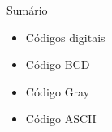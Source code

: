 
\begin{frame}{Sumário}
    \begin{itemize}
        \item Códigos digitais
        \item Código BCD
        \item Código Gray
        \item Código ASCII
    \end{itemize}
\end{frame}
